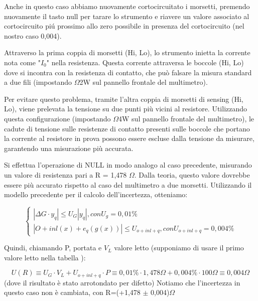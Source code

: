 Anche in questo caso abbiamo nuovamente cortocircuitato i morsetti, premendo nuovamente il tasto null per tarare lo strumento e riavere un valore associato al cortocircuito pi\'u prossimo allo zero possibile in presenza del cortocircuito (nel nostro caso 0,004).


Attraverso la prima coppia di morsetti (Hi, Lo), lo strumento inietta la corrente nota come "$I_0$" nella resistenza. Questa corrente attraversa le boccole (Hi, Lo) dove si incontra con la resistenza di contatto, che può falsare la misura standard a due fili (impostando $\Omega$2W sul pannello frontale del multimetro).

Per evitare questo problema, tramite l'altra coppia di morsetti di sensing (Hi, Lo), viene prelevata la tensione su due punti più vicini al resistore. Utilizzando questa configurazione (impostando $\Omega$4W sul pannello frontale del multimetro), le cadute di tensione sulle resistenze di contatto presenti sulle boccole che portano la corrente al resistore in prova possono essere escluse dalla tensione da misurare, garantendo una misurazione più accurata.

Si effettua l'operazione di NULL in modo analogo al caso precedente, misurando un valore di resistenza pari a R = 1,478 $\Omega$. Dalla teoria, questo valore dovrebbe essere più accurato rispetto al caso del multimetro a due morsetti. Utilizzando il modello precedente per il calcolo dell'incertezza, otteniamo:

\begin{equation}
    \left\{\begin{array}{l}
| \Delta G \cdot y_q | \leq U_G |y_q|,    con U_g=0,01\%
\\ | O + inl(x) + e_q(g(x)) | \leq U_{o+inl+q}, con U_{o+inl+q}=0,004\%
\end{array}\right.
\end{equation}


    


Quindi, chiamando P, portata e $V_L$ valore letto (supponiamo di usare il primo valore letto nella tabella \label{mult_port}):

\begin{equation*}
    U(R) \equiv U_G \cdot V_L + U_{o+inl+q} \cdot P \equiv 0,01\% \cdot 1,478\Omega + 0,004 \% \cdot 100 \Omega \equiv 0,004 \Omega 
\end{equation*}
(dove il risultato è stato arrotondato per difetto)
Notiamo che l’incertezza in questo caso non è cambiata, con R=(+1,478 $\pm$ 0,004)$\Omega$



